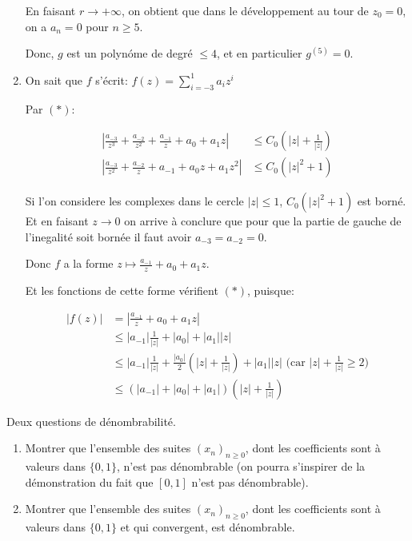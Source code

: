\documentclass[10pt,a4paper,oneside]{article}
\newenvironment{exercice}[1][Exercice]{\begin{trivlist}
\item[\hskip \labelsep {\bfseries #1}]}{\end{trivlist}}
\newenvironment{solution}[1][Solution]{\begin{trivlist}
\item[\hskip \labelsep {\bfseries #1}]}{\end{trivlist}}
\begin{document}
\begin{solution}
\begin{enumerate}
En faisant $r \to +\infty$, on obtient que dans le développement au tour de $z_0 = 0$, on a $a_n = 0$ pour $n \geq 5$.

Donc, $g$ est un polynóme de degré $\leq 4$, et en particulier $g^{(5)} = 0$.

\item
On sait que $f$ s'écrit: $f(z) = \sum_{i = -3}^{1} a_i z^i$

Par $(*)$:

\begin{align}
| \frac{a_{-3}}{z^3} + \frac{a_{-2}}{z^2} + \frac{a_{-1}}{z} + a_0 + a_1 z | &\leq C_0(|z| + \frac{1}{|z|}) \nonumber \\
| \frac{a_{-3}}{z^2} + \frac{a_{-2}}{z} + a_{-1} + a_0 z + a_1 z^2 | &\leq C_0(|z|^2 + 1) \nonumber
\end{align}

Si l'on considere les complexes dans le cercle $|z| \leq 1$, $C_0(|z|^2 + 1)$ est borné. Et en faisant $z \to 0$ on arrive à conclure que pour que la partie de gauche de l'inegalité soit bornée il faut avoir $a_{-3} = a_{-2} = 0$.

Donc $f$ a la forme $\boxed{ z \mapsto \frac{a_{-1}}{z} + a_0 + a_1 z }$.

Et les fonctions de cette forme vérifient $(*)$, puisque:

\begin{align}
|f(z)| &= | \frac{a_{-1}}{z} + a_0 + a_1 z | \nonumber \\
&\leq |a_{-1}|\frac{1}{|z|} + |a_0| + |a_1| |z| \nonumber \\
&\leq |a_{-1}|\frac{1}{|z|} + \frac{|a_0|}{2}(|z| + \frac{1}{|z|}) + |a_1| |z| \text{ (car } |z| + \frac{1}{|z|} \geq 2) \nonumber \\
&\leq (|a_{-1}| + |a_0| + |a_1|)(|z| + \frac{1}{|z|}) \nonumber
\end{align}

\end{enumerate}

\end{solution}


\begin{exercice}
Deux questions de dénombrabilité.

\begin{enumerate}
\item
Montrer que l'ensemble des suites $(x_n)_{n \geq 0}$, dont les coefficients sont à valeurs dans $\{ 0,1 \}$, n'est pas dénombrable (on pourra s'inspirer de la démonstration du fait que $[0,1]$ n'est pas dénombrable).

\item
Montrer que l'ensemble des suites $(x_n)_{n \geq 0}$, dont les coefficients sont à valeurs dans $\{ 0,1 \}$ et qui convergent, est dénombrable.
\end{enumerate}
\end{exercice}
\end{document}
